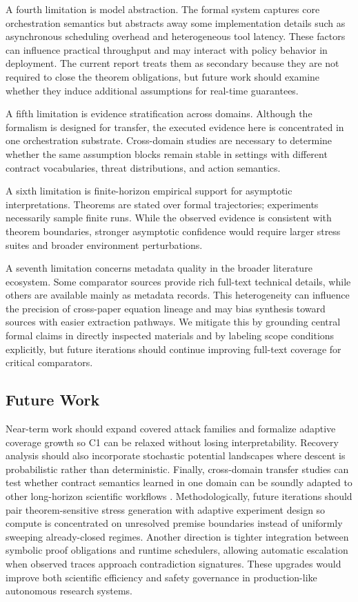 \documentclass{article} %
\begin{document}
A fourth limitation is model abstraction. The formal system captures core orchestration semantics but abstracts away some implementation details such as asynchronous scheduling overhead and heterogeneous tool latency. These factors can influence practical throughput and may interact with policy behavior in deployment. The current report treats them as secondary because they are not required to close the theorem obligations, but future work should examine whether they induce additional assumptions for real-time guarantees.

A fifth limitation is evidence stratification across domains. Although the formalism is designed for transfer, the executed evidence here is concentrated in one orchestration substrate. Cross-domain studies are necessary to determine whether the same assumption blocks remain stable in settings with different contract vocabularies, threat distributions, and action semantics.

A sixth limitation is finite-horizon empirical support for asymptotic interpretations. Theorems are stated over formal trajectories; experiments necessarily sample finite runs. While the observed evidence is consistent with theorem boundaries, stronger asymptotic confidence would require larger stress suites and broader environment perturbations.

A seventh limitation concerns metadata quality in the broader literature ecosystem. Some comparator sources provide rich full-text technical details, while others are available mainly as metadata records. This heterogeneity can influence the precision of cross-paper equation lineage and may bias synthesis toward sources with easier extraction pathways. We mitigate this by grounding central formal claims in directly inspected materials and by labeling scope conditions explicitly, but future iterations should continue improving full-text coverage for critical comparators.

\subsection{Future Work}
Near-term work should expand covered attack families and formalize adaptive coverage growth so C1 can be relaxed without losing interpretability. Recovery analysis should also incorporate stochastic potential landscapes where descent is probabilistic rather than deterministic. Finally, cross-domain transfer studies can test whether contract semantics learned in one domain can be soundly adapted to other long-horizon scientific workflows \citep{xin2025,reddy2025,pham2026,zhang2025,klang2025}.
Methodologically, future iterations should pair theorem-sensitive stress generation with adaptive experiment design so compute is concentrated on unresolved premise boundaries instead of uniformly sweeping already-closed regimes. Another direction is tighter integration between symbolic proof obligations and runtime schedulers, allowing automatic escalation when observed traces approach contradiction signatures. These upgrades would improve both scientific efficiency and safety governance in production-like autonomous research systems.
\end{document}
